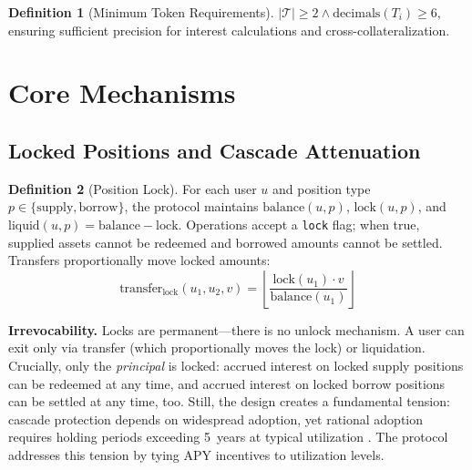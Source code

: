 \documentclass[10pt,a4paper,twocolumn]{article}
\theoremstyle{definition}
\newtheorem{definition}{Definition}[section]
\theoremstyle{plain}
\theoremstyle{remark}
\begin{document}
\begin{definition}[Minimum Token Requirements]
\label{def:token-constraints}
$|\mathcal{T}| \geq 2 \land \text{decimals}(T_i) \geq 6$, ensuring sufficient precision for interest calculations and cross-collateralization.
\end{definition}

\section{Core Mechanisms}
\label{sec:mechanisms}

\subsection{Locked Positions and Cascade Attenuation}
\label{subsec:locked-positions}

\begin{definition}[Position Lock]
\label{def:position-lock}
For each user $u$ and position type $p \in \{\text{supply}, \text{borrow}\}$, the protocol maintains $\text{balance}(u,p)$, $\text{lock}(u,p)$, and $\text{liquid}(u,p) = \text{balance} - \text{lock}$. Operations accept a \texttt{lock} flag; when true, supplied assets cannot be redeemed and borrowed amounts cannot be settled. Transfers proportionally move locked amounts:
\begin{equation}
\label{eq:lock-transfer}
\text{transfer}_{\text{lock}}(u_1, u_2, v) = \left\lfloor \frac{\text{lock}(u_1) \cdot v}{\text{balance}(u_1)} \right\rfloor
\end{equation}
\end{definition}

\textbf{Irrevocability.} Locks are permanent---there is no unlock mechanism. A user can exit only via transfer (which proportionally moves the lock) or liquidation. Crucially, only the \emph{principal} is locked: accrued interest on locked supply positions can be redeemed at any time, and accrued interest on locked borrow positions can be settled at any time, too. Still, the design creates a fundamental tension: cascade protection depends on widespread adoption, yet rational adoption requires holding periods exceeding 5~years at typical utilization \cite[\S C]{apx}. The protocol addresses this tension by tying APY incentives to utilization levels.
\end{document}
